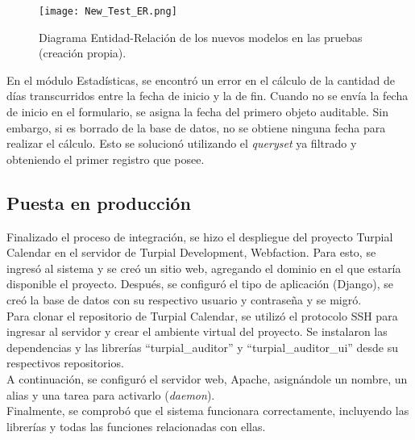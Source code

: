 \begin{figure}[h]
\centering
\texttt{[image: New\_Test\_ER.png]}
\caption{ Diagrama Entidad-Relación de los nuevos modelos en las pruebas (creación propia).}
\label{fig:figura6.14}
\end{figure}


En el módulo Estadísticas, se encontró un error en el cálculo de la cantidad de días transcurridos entre la fecha de inicio y la de fin. Cuando no se envía la fecha de inicio en el formulario, se asigna la fecha del primero objeto auditable. Sin embargo, si es borrado de la base de datos, no se obtiene ninguna fecha para realizar el cálculo. Esto se solucionó utilizando el \textit{queryset} ya filtrado y obteniendo el primer registro que posee.

\subsection{Puesta en producción}

Finalizado el proceso de integración, se hizo el despliegue del proyecto Turpial Calendar en el servidor de Turpial Development, Webfaction. Para esto, se ingresó al sistema y se creó un sitio web, agregando el dominio en el que estaría disponible el proyecto. Después, se configuró el tipo de aplicación (Django), se creó la base de datos con su respectivo usuario y contraseña y se migró.\\

Para clonar el repositorio de Turpial Calendar, se utilizó el protocolo SSH para ingresar al servidor y crear el ambiente virtual del proyecto. Se instalaron las dependencias y las librerías “turpial\_auditor” y “turpial\_auditor\_ui” desde su respectivos repositorios.\\

A continuación, se configuró el servidor web, Apache, asignándole un nombre, un alias y una tarea para activarlo (\textit{daemon}). \\

Finalmente, se comprobó que el sistema funcionara correctamente, incluyendo las librerías y todas las funciones relacionadas con ellas.
